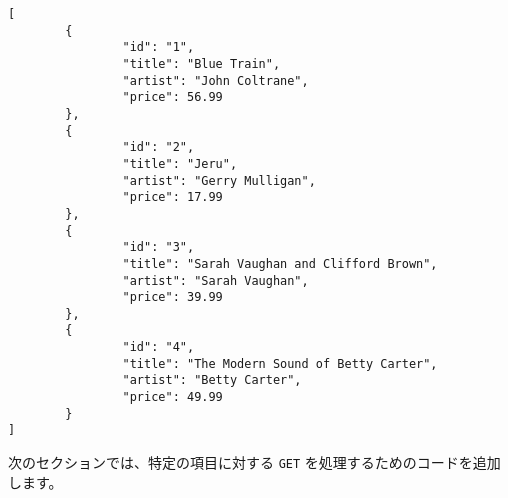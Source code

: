 \begin{enumerate}
\begin{lstlisting}[numbers=none]
[
        {
                "id": "1",
                "title": "Blue Train",
                "artist": "John Coltrane",
                "price": 56.99
        },
        {
                "id": "2",
                "title": "Jeru",
                "artist": "Gerry Mulligan",
                "price": 17.99
        },
        {
                "id": "3",
                "title": "Sarah Vaughan and Clifford Brown",
                "artist": "Sarah Vaughan",
                "price": 39.99
        },
        {
                "id": "4",
                "title": "The Modern Sound of Betty Carter",
                "artist": "Betty Carter",
                "price": 49.99
        }
]
\end{lstlisting}
\end{enumerate}

次のセクションでは、特定の項目に対する \texttt{GET}
を処理するためのコードを追加します。
